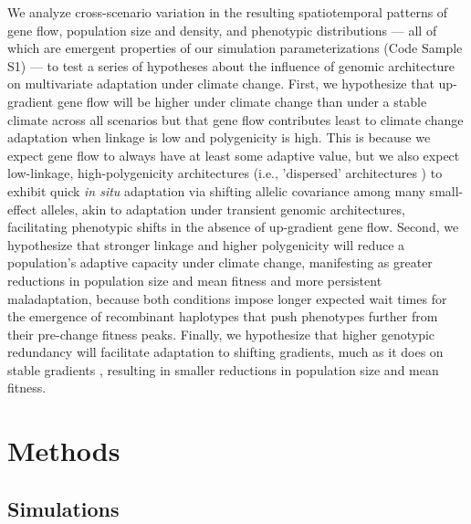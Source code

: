 \documentclass[9pt,twocolumn,twoside,lineno]{new_article}
\begin{document}
We analyze cross-scenario variation in the resulting spatiotemporal
patterns of gene flow, population size and density, and phenotypic
distributions --- all of which are emergent properties of our simulation
parameterizations (Code Sample S1) --- 
to test a series of hypotheses about the influence of genomic architecture 
on multivariate adaptation under climate change. First, we hypothesize that up-gradient 
gene flow will be higher under climate change than under a stable climate across all
scenarios but that gene flow contributes least to climate change adaptation when
linkage is low and polygenicity is high.
This is because we expect gene flow to always have
at least some adaptive value, but we also expect low-linkage, high-polygenicity architectures 
(i.e., 'dispersed' architectures \cite{yeaman_review}) to exhibit quick \textit{in situ}
adaptation via shifting allelic covariance among many small-effect alleles, akin to adaptation 
under transient genomic architectures, facilitating phenotypic shifts in the absence of up-gradient gene flow.
Second, we hypothesize that stronger linkage 
and higher polygenicity will reduce a population's adaptive capacity under climate change,
manifesting as greater reductions in population size and mean fitness
and more persistent maladaptation, because both conditions impose longer expected
wait times for the emergence of recombinant haplotypes that push phenotypes
further from their pre-change fitness peaks. Finally, we hypothesize that higher genotypic redundancy
will facilitate adaptation to shifting gradients, much as it does on stable gradients 
\cite{barghi_redundancy,manceau,yeaman_amnat}, resulting in smaller reductions 
in population size and mean fitness.


\section*{Methods}

\subsection*{Simulations}
\end{document}
